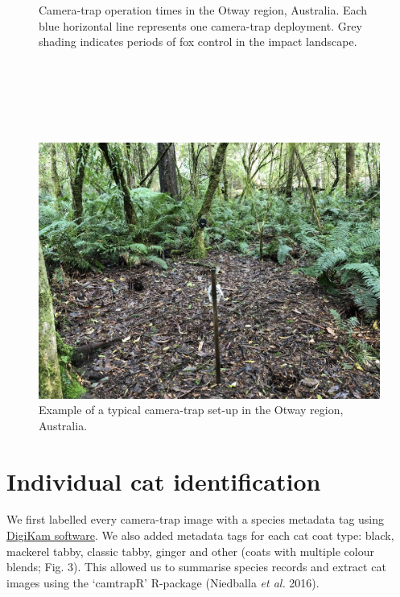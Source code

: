 \documentclass[11pt,a4paper,titlepage,twoside,openright]{style/unimelbthesis}
\begin{document}
\begin{mainmatter}
\begin{figure}
{}

\caption{Camera-trap operation times in the Otway region, Australia. Each blue horizontal line represents one camera-trap deployment. Grey shading indicates periods of fox control in the impact landscape.}\label{fig:density-camop}
\end{figure}
\newpage

\(~\)

\(~\)

\(~\)
\begin{figure}

{\centering \includegraphics[width=1\linewidth]{figure/c3/camtrap1} 

}

\caption{Example of a typical camera-trap set-up in the Otway region, Australia.}\label{fig:density-cam-photo}
\end{figure}
\newpage

\hypertarget{density-app-id}{%
\section{Individual cat identification}\label{density-app-id}}

We first labelled every camera-trap image with a species metadata tag using \href{https://www.digikam.org}{DigiKam software}. We also added metadata tags for each cat coat type: black, mackerel tabby, classic tabby, ginger and other (coats with multiple colour blends; Fig. 3). This allowed us to summarise species records and extract cat images using the `camtrapR' R-package (Niedballa \emph{et al.} 2016).


\end{mainmatter}
\end{document}
